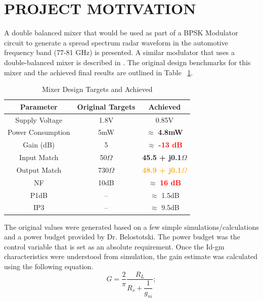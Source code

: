 \documentclass{article}                                                         %
\begin{document}
\section{PROJECT MOTIVATION}
A double balanced mixer that would be used as part of a  BPSK Modulator circuit
to generate a spread spectrum radar waveform in the automotive frequency band (77-81 GHz) is presented. A similar modulator
that uses a double-balanced mixer is described in \cite{schleicher2010biphase}. The original design benchmarks for this mixer
and the achieved final results are outlined in Table ~\ref{table:goalsnresults}.\vspace{3mm}
\vspace{3mm}
\begin{table}[H]
\centering
 \begin{tabular}{ | c | c | c |}
   \hline
    \textbf{Parameter} & \textbf{Original Targets} & \textbf{Achieved}  \\
    \hline
    \hline
    Supply Voltage & 1.8V & 0.85V \\
    \hline
    Power Consumption & 5mW & $\approx$ \textbf{\textcolor{OliveGreen}{4.8mW}}\\
    \hline
    Gain (dB)   & 5 & $\approx$ \textbf{\textcolor{Red}{-13 dB}} \\
    \hline
    Input Match  & 50$\Omega$ & \textbf{\textcolor{OliveGreen}{45.5 + j0.1$\Omega$}} \\
    \hline
    Output Match & 730$\Omega$ & \textbf{\textcolor{Orange}{48.9 + j0.1$\Omega$}}\\
    \hline
    NF & 10dB & $\approx$ \textbf{\textcolor{Red}{16 dB}}\\
    \hline
    P1dB & -- & $\approx$ 1.5dB  \\
    \hline
    IP3 & -- & $\approx$ 9.5dB  \\
    \hline
  \end{tabular}
  \caption{Mixer Design Targets and Achieved}
  \label{table:goalsnresults}
\end{table}
The original values were generated based on a few simple simulations/calculations and a power budget provided by Dr. Belostotski. The
power budget was the control variable that is set as an absolute requirement.  Once the Id-gm
characteristics were understood from simulation, the gain estimate was calculated using the following equation.
\begin{equation}
  \label{eq:idealgain}
  G=\dfrac{2}{\pi}\dfrac{R_L}{R_s + \dfrac{1}{g_m}};
\end{equation}
\end{document}
